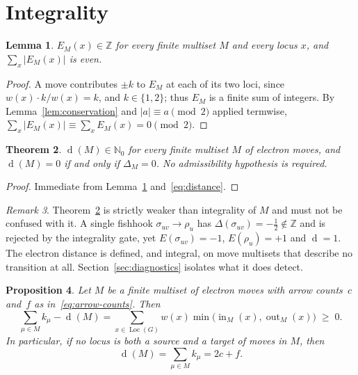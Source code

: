 \documentclass[11pt]{article}
\numberwithin{equation}{section}
\newcommand{\Loc}{\operatorname{Loc}}
\newcommand{\gout}{\operatorname{out}}
\newcommand{\gin}{\operatorname{in}}
\newcommand{\del}{\operatorname{d}}
\theoremstyle{plain}
\newtheorem{theorem}{Theorem}[section]
\newtheorem{proposition}[theorem]{Proposition}
\newtheorem{lemma}[theorem]{Lemma}
\theoremstyle{definition}
\theoremstyle{remark}
\newtheorem{remark}[theorem]{Remark}
\begin{document}
\section{Integrality}
\label{sec:integrality}

\begin{lemma}
\label{lem:E-integral}
$E_M(x)\in\mathbb Z$ for every finite multiset $M$ and every locus $x$, and
$\sum_x|E_M(x)|$ is even.
\end{lemma}

\begin{proof}
A move contributes $\pm k$ to $E_M$ at each of its two loci, since
$w(x)\cdot k/w(x)=k$, and $k\in\{1,2\}$; thus $E_M$ is a finite sum of
integers.  By Lemma~\ref{lem:conservation} and $|a|\equiv a\pmod 2$ applied
termwise, $\sum_x|E_M(x)|\equiv\sum_x E_M(x)=0\pmod2$.
\end{proof}

\begin{theorem}
\label{thm:integer}
$\del(M)\in\mathbb N_0$ for every finite multiset $M$ of electron moves, and
$\del(M)=0$ if and only if $\Delta_M=0$.  No admissibility hypothesis is
required.
\end{theorem}

\begin{proof}
Immediate from Lemma~\ref{lem:E-integral} and~\eqref{eq:distance}.
\end{proof}

\begin{remark}
\label{rem:integrality-weaker}
Theorem~\ref{thm:integer} is strictly weaker than integrality of $M$ and must
not be confused with it.  A single fishhook $\sigma_{uv}\to\rho_u$ has
$\Delta(\sigma_{uv})=-\tfrac12\notin\mathbb Z$ and is rejected by the
integrality gate, yet $E(\sigma_{uv})=-1$, $E(\rho_u)=+1$ and $\del=1$.  The
electron distance is defined, and integral, on move multisets that describe no
transition at all.  Section~\ref{sec:diagnostics} isolates what it does
detect.
\end{remark}

\begin{proposition}
\label{prop:arrow-count}
Let $M$ be a finite multiset of electron moves with arrow counts~$c$ and~$f$
as in~\eqref{eq:arrow-counts}.  Then
\begin{equation}
  \sum_{\mu\in M}k_\mu-\del(M)
  =\sum_{x\in\Loc(G)}w(x)\min\bigl(\gin_M(x),\gout_M(x)\bigr)\;\ge\;0 .
  \label{eq:arrow-count-defect}
\end{equation}
In particular, if no locus is both a source and a target of moves in $M$, then
\begin{equation}
  \del(M)=\sum_{\mu\in M}k_\mu=2c+f .
  \label{eq:arrow-count}
\end{equation}
\end{proposition}
\end{document}
